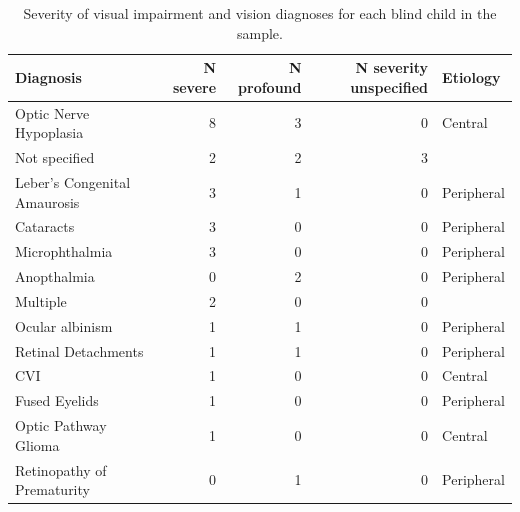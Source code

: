 \documentclass[
  man,floatsintext]{apa6}
\begin{document}
\begin{table}[H]

\caption{\label{tab:diagnosis-table}Severity of visual impairment and vision diagnoses for each blind child in the sample.}
\centering
\begin{tabular}[t]{l|r|r|r|l}
\hline
Diagnosis & N severe & N profound & N severity unspecified & Etiology\\
\hline
Optic Nerve Hypoplasia & 8 & 3 & 0 & Central\\
\hline
Not specified & 2 & 2 & 3 & \\
\hline
Leber's Congenital Amaurosis & 3 & 1 & 0 & Peripheral\\
\hline
Cataracts & 3 & 0 & 0 & Peripheral\\
\hline
Microphthalmia & 3 & 0 & 0 & Peripheral\\
\hline
Anopthalmia & 0 & 2 & 0 & Peripheral\\
\hline
Multiple & 2 & 0 & 0 & \\
\hline
Ocular albinism & 1 & 1 & 0 & Peripheral\\
\hline
Retinal Detachments & 1 & 1 & 0 & Peripheral\\
\hline
CVI & 1 & 0 & 0 & Central\\
\hline
Fused Eyelids & 1 & 0 & 0 & Peripheral\\
\hline
Optic Pathway Glioma & 1 & 0 & 0 & Central\\
\hline
Retinopathy of Prematurity & 0 & 1 & 0 & Peripheral\\
\hline
\end{tabular}
\end{table}
\end{document}
